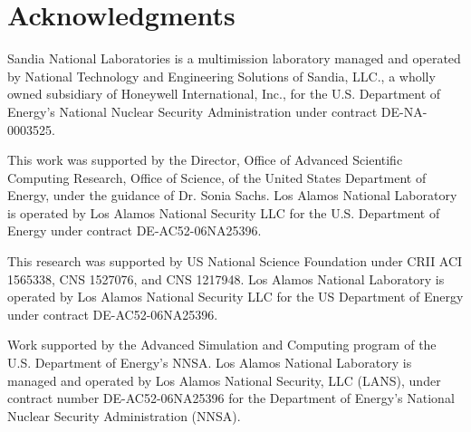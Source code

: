 \documentclass[sigconf]{acmart}
\begin{document}
\section*{Acknowledgments}
Sandia National Laboratories is a multimission laboratory managed and operated 
by National Technology and Engineering Solutions of Sandia, LLC., a wholly 
owned subsidiary of Honeywell International, Inc., for the U.S. Department of 
Energy's National Nuclear Security Administration under contract DE-NA-0003525.


This work was supported by the Director, Office of Advanced Scientific
Computing Research, Office of Science, of the United States Department
of Energy, under the guidance of Dr. Sonia Sachs. Los Alamos National
Laboratory is operated by Los Alamos National Security LLC for the U.S.
Department of Energy under contract DE-AC52-06NA25396.

This research was supported by US National Science Foundation under CRII
ACI 1565338, CNS 1527076, and CNS 1217948. Los Alamos National
Laboratory is operated by Los Alamos National Security LLC for the US
Department of Energy under contract DE-AC52-06NA25396.

Work supported by the Advanced Simulation and Computing program of the
U.S. Department of Energy's NNSA\@.  Los Alamos National Laboratory is
managed and operated by Los Alamos National Security, LLC (LANS), under
contract number DE-AC52-06NA25396 for the Department of Energy's
National Nuclear Security Administration (NNSA).



\end{document}
